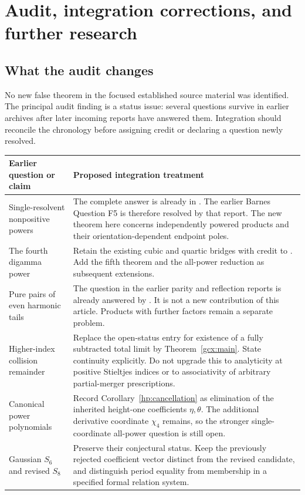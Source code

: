 \section{Audit, integration corrections, and further research}
\label{audit:section}

\subsection{What the audit changes}

No new false theorem in the focused established source material was
identified. The principal audit finding is a status issue: several
questions survive in earlier archives after later incoming reports have
answered them. Integration should reconcile the chronology before
assigning credit or declaring a question newly resolved.

\begin{longtable}{>{\raggedright\arraybackslash}p{}
                  >{\raggedright\arraybackslash}p{}}
\toprule
Earlier question or claim & Proposed integration treatment\\
\midrule
\endhead
Single-resolvent nonpositive powers &
The complete answer is already in \cite{repo:quartic}. The earlier
Barnes Question F5 is therefore resolved by that report. The new
theorem here concerns independently powered products and their
orientation-dependent endpoint poles.\\[5pt]
The fourth digamma power &
Retain the existing cubic and quartic bridges with credit to
\cite{repo:cubic,repo:barnes,repo:quartic}. Add the fifth theorem and the
all-power reduction as subsequent extensions.\\[5pt]
Pure pairs of even harmonic tails &
The question in the earlier parity and reflection reports is already
answered by \cite{repo:quartic}. It is not a new contribution of this
article. Products with further factors remain a separate problem.\\[5pt]
Higher-index collision remainder &
Replace the open-status entry for existence of a fully subtracted
total limit by Theorem~\ref{gcx:main}. State continuity explicitly.
Do not upgrade this to analyticity at positive Stieltjes indices or
to associativity of arbitrary partial-merger prescriptions.\\[5pt]
Canonical power polynomials &
Record Corollary~\ref{hp:cancellation} as elimination of the inherited
height-one coefficients $\eta,\theta$. The additional derivative
coordinate $\chi_4$ remains, so the stronger single-coordinate
all-power question is still open.\\[5pt]
Gaussian $S_6$ and revised $S_8$ &
Preserve their conjectural status. Keep the previously rejected
coefficient vector distinct from the revised candidate, and distinguish
period equality from membership in a specified formal relation system.\\
\bottomrule
\end{longtable}

